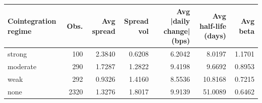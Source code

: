 \begin{tabular}{lrrrrrr}
\toprule
Cointegration regime & Obs. & Avg spread & Spread vol & Avg |daily change| (bps) & Avg half-life (days) & Avg beta \\
\midrule
strong & 100 & 2.3840 & 0.6208 & 6.2042 & 8.0197 & 1.1701 \\
moderate & 290 & 1.7287 & 1.2822 & 9.4198 & 9.6692 & 0.8953 \\
weak & 292 & 0.9326 & 1.4160 & 8.5536 & 10.8168 & 0.7215 \\
none & 2320 & 1.3276 & 1.8017 & 9.9139 & 51.0089 & 0.6462 \\
\bottomrule
\end{tabular}
